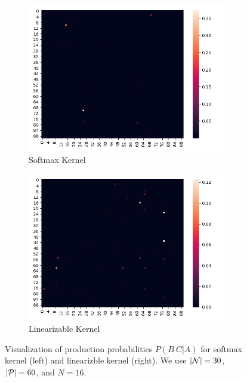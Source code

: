 \documentclass{article}
\begin{document}
\begin{figure}[!htp]
  \centering
  \begin{subfigure}[t]{0.45\textwidth}
  \centering
  \includegraphics[width=0.95\textwidth]{imgs/softmax/10_exp.png}
  \caption{Softmax Kernel}
  \end{subfigure}
  \begin{subfigure}[t]{0.45\textwidth}
  \centering
  \includegraphics[width=0.95\textwidth]{imgs/rff/10_exp.png}
  \caption{Linearizable Kernel}
  \end{subfigure}
  \caption{\label{fig:example_production3}Visualization of production probabilities $P(B\ C|A)$ for softmax kernel (left) and linearizble kernel (right). We use $|\mathcal{N}|=30$, $|\mathcal{P}|=60$, and $N=16$.}
\end{figure}
\end{document}
